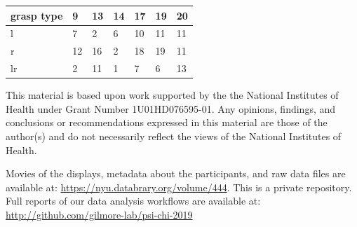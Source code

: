 \documentclass[landscape,final,paperwidth=48in,paperheight=33in,fontscale=0.285]{baposter}
\begin{document}
\begin{poster}
{
\begin{center}
\vspace{0.3em}
\begin{tabular}{ | m{5em} | m{1cm}| m{1cm} | m{1cm} | m{1cm} | m{1cm} | m{1cm} |} 
\hline
grasp type &9 & 13 & 14 & 17 & 19 & 20 \\ 
\hline
l & 7 & 2 & 6 & 10 & 11 & 11\\ 
\hline
r & 12 & 16 & 2 & 18 & 19 & 11 \\ 
\hline
lr & 2 & 11 & 1 & 7 & 6 & 13 \\
\hline
\end{tabular}
\vspace{0.3em}
\end{center}
}

    {
   \small
      This material is based upon work supported by the the National Institutes of Health under Grant Number 1U01HD076595-01.
      Any opinions, findings, and conclusions or recommendations expressed in this material are those of the author(s) and do not necessarily reflect the views of the National Institutes of Health.
    }

    {
    \smaller
    
       Movies of the displays, metadata about the participants, and raw data files are available at: \url{https://nyu.databrary.org/volume/444}. This is a private repository. Full reports of our data analysis workflows are available at: \url{http://github.com/gilmore-lab/psi-chi-2019}
       }

  {
  
  \tiny
  
          \renewcommand{\refname}{\vspace{-0.5em}} %
          
          
          
}
\end{poster}
\end{document}
